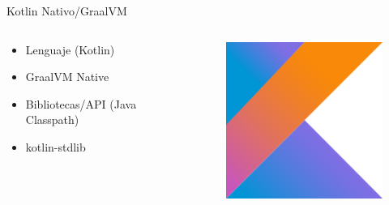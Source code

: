 \documentclass[aspectratio=169]{beamer}
\begin{document}
\begin{frame}[fragile]{Kotlin Nativo/GraalVM}
    \begin{columns}
        \begin{column}{0.5\textwidth}
            \begin{itemize}
                \item Lenguaje (Kotlin)
                \item GraalVM Native
                \item Bibliotecas/API (Java Classpath)
                \item kotlin-stdlib
            \end{itemize}
        \end{column}
        \begin{column}{0.5\textwidth}  %
            \begin{figure}
                \centering
                \includegraphics[width=0.4\linewidth]{Images/kotlin}
            \end{figure}
        \end{column}
    \end{columns}
\end{frame}
\end{document}
